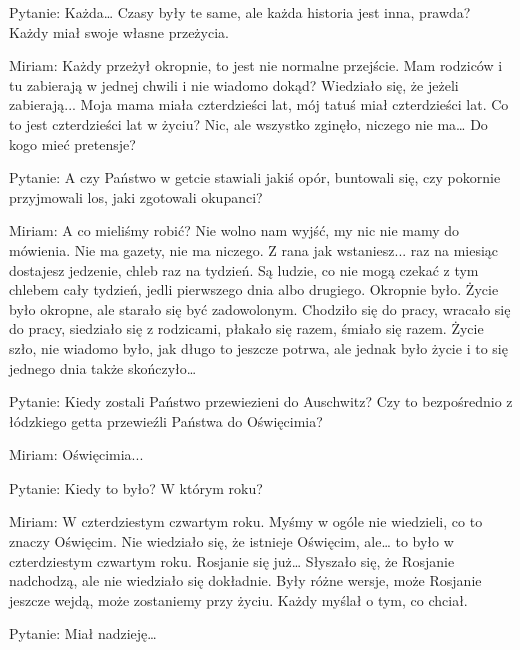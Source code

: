  

Pytanie: Każda… Czasy były te same, ale każda historia jest inna, prawda? Każdy miał swoje własne przeżycia. 

Miriam: Każdy przeżył okropnie, to jest nie normalne przejście. Mam rodziców i tu zabierają w jednej chwili i nie wiadomo dokąd? Wiedziało się, że jeżeli zabierają... Moja mama miała czterdzieści lat, mój tatuś miał czterdzieści lat. Co to jest czterdzieści lat w życiu? Nic, ale wszystko zginęło, niczego nie ma… Do kogo mieć pretensje? 

 

Pytanie: A czy Państwo w getcie stawiali jakiś opór, buntowali się, czy pokornie przyjmowali los, jaki zgotowali okupanci? 

Miriam: A co mieliśmy robić? Nie wolno nam wyjść, my nic nie mamy do mówienia. Nie ma gazety, nie ma niczego. Z rana jak wstaniesz... raz na miesiąc dostajesz jedzenie, chleb raz na tydzień. Są ludzie, co nie mogą czekać z tym chlebem cały tydzień, jedli pierwszego dnia albo drugiego. Okropnie było. Życie było okropne, ale starało się być zadowolonym. Chodziło się do pracy, wracało się do pracy, siedziało się z rodzicami, płakało się razem, śmiało się razem. Życie szło, nie wiadomo było, jak długo to jeszcze potrwa, ale jednak było życie i to się jednego dnia także skończyło… 

 

Pytanie: Kiedy zostali Państwo przewiezieni do Auschwitz? Czy to bezpośrednio z łódzkiego getta przewieźli Państwa do Oświęcimia? 

Miriam: Oświęcimia... 

Pytanie: Kiedy to było? W którym roku? 

Miriam: W czterdziestym czwartym roku. Myśmy w ogóle nie wiedzieli, co to znaczy Oświęcim. Nie wiedziało się, że istnieje Oświęcim, ale… to było w czterdziestym czwartym roku. Rosjanie się już… Słyszało się, że Rosjanie nadchodzą, ale nie wiedziało się dokładnie. Były różne wersje, może Rosjanie jeszcze wejdą, może zostaniemy przy życiu. Każdy myślał o tym, co chciał. 

 

Pytanie: Miał nadzieję… 

